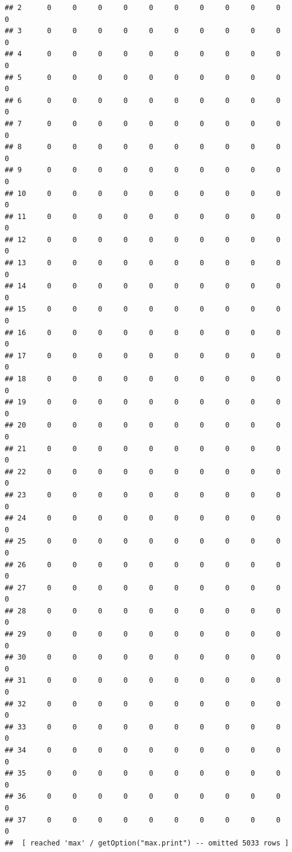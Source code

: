\documentclass{article}\usepackage[]{graphicx}\usepackage[]{xcolor}
\makeatletter
\newenvironment{kframe}{%
 \def\at@end@of@kframe{}%
 \ifinner\ifhmode%
  \def\at@end@of@kframe{\end{minipage}}%
  \begin{minipage}{\columnwidth}%
 \fi\fi%
 \def\FrameCommand##1{\hskip\@totalleftmargin \hskip-\fboxsep
 \colorbox{shadecolor}{##1}\hskip-\fboxsep
     \hskip-\linewidth \hskip-\@totalleftmargin \hskip\columnwidth}%
 \MakeFramed {\advance\hsize-\width
   \@totalleftmargin\z@ \linewidth\hsize
   \@setminipage}}%
 {\par\unskip\endMakeFramed%
 \at@end@of@kframe}
\newenvironment{knitrout}{}{} %
\makeatother
\begin{document}
\begin{knitrout}
\begin{kframe}
\begin{verbatim}
## 2      0     0     0     0     0     0     0     0     0     0     0
## 3      0     0     0     0     0     0     0     0     0     0     0
## 4      0     0     0     0     0     0     0     0     0     0     0
## 5      0     0     0     0     0     0     0     0     0     0     0
## 6      0     0     0     0     0     0     0     0     0     0     0
## 7      0     0     0     0     0     0     0     0     0     0     0
## 8      0     0     0     0     0     0     0     0     0     0     0
## 9      0     0     0     0     0     0     0     0     0     0     0
## 10     0     0     0     0     0     0     0     0     0     0     0
## 11     0     0     0     0     0     0     0     0     0     0     0
## 12     0     0     0     0     0     0     0     0     0     0     0
## 13     0     0     0     0     0     0     0     0     0     0     0
## 14     0     0     0     0     0     0     0     0     0     0     0
## 15     0     0     0     0     0     0     0     0     0     0     0
## 16     0     0     0     0     0     0     0     0     0     0     0
## 17     0     0     0     0     0     0     0     0     0     0     0
## 18     0     0     0     0     0     0     0     0     0     0     0
## 19     0     0     0     0     0     0     0     0     0     0     0
## 20     0     0     0     0     0     0     0     0     0     0     0
## 21     0     0     0     0     0     0     0     0     0     0     0
## 22     0     0     0     0     0     0     0     0     0     0     0
## 23     0     0     0     0     0     0     0     0     0     0     0
## 24     0     0     0     0     0     0     0     0     0     0     0
## 25     0     0     0     0     0     0     0     0     0     0     0
## 26     0     0     0     0     0     0     0     0     0     0     0
## 27     0     0     0     0     0     0     0     0     0     0     0
## 28     0     0     0     0     0     0     0     0     0     0     0
## 29     0     0     0     0     0     0     0     0     0     0     0
## 30     0     0     0     0     0     0     0     0     0     0     0
## 31     0     0     0     0     0     0     0     0     0     0     0
## 32     0     0     0     0     0     0     0     0     0     0     0
## 33     0     0     0     0     0     0     0     0     0     0     0
## 34     0     0     0     0     0     0     0     0     0     0     0
## 35     0     0     0     0     0     0     0     0     0     0     0
## 36     0     0     0     0     0     0     0     0     0     0     0
## 37     0     0     0     0     0     0     0     0     0     0     0
##  [ reached 'max' / getOption("max.print") -- omitted 5033 rows ]

\end{verbatim}
\end{kframe}
\end{knitrout}
\end{document}
